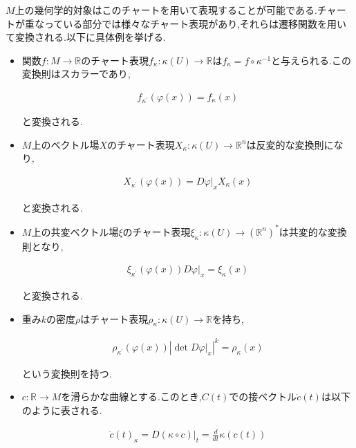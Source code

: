 \documentclass{jsarticle}
\begin{document}
$M$上の幾何学的対象はこのチャートを用いて表現することが可能である.チャートが重なっている部分では様々なチャート表現があり,それらは遷移関数を用いて変換される.以下に具体例を挙げる.\\

\begin{itemize}

\item 関数$f:M \to \mathbb{R}$のチャート表現$f_\kappa:\kappa(U) \to \mathbb{R}$は$f_\kappa = f \circ \kappa^{-1}$と与えられる.この変換則はスカラーであり,

\begin{align}
f_{\kappa^\prime}(\varphi(x)) =f_\kappa (x)
\end{align}

と変換される.\\

\item $M$上のベクトル場$X$のチャート表現$X_\kappa:\kappa(U) \to \mathbb{R}^n$は反変的な変換則になり,

\begin{align}
X_{\kappa^\prime}(\varphi(x)) = D\varphi\rvert_x X_\kappa(x)
\end{align}

と変換される.\\

\item $M$上の共変ベクトル場$\xi$のチャート表現$\xi_\kappa:\kappa(U)\to (\mathbb{R}^n)^*$は共変的な変換則となり,

\begin{align}
\xi_{\kappa^\prime}(\varphi(x))D\varphi\rvert_x = \xi_\kappa(x)
\end{align}

と変換される.\\

\item 重み$k$の密度$\rho$はチャート表現$\rho_\kappa:\kappa(U) \to \mathbb{R}$を持ち,

\begin{align}
\rho_{\kappa^\prime}(\varphi(x))|\det D\varphi\rvert_x|^k= \rho_\kappa(x)
\end{align}

という変換則を持つ.\\

\item $c:\mathbb{R} \to M$を滑らかな曲線とする.このとき,$C(t)$での接ベクトル$\dot{c}(t)$は以下のように表される.

\begin{align}
\dot{c}(t)_\kappa=D(\kappa \circ c)\rvert_t=\frac{d}{dt}\kappa(c(t))
\end{align}


\end{itemize}
\end{document}
